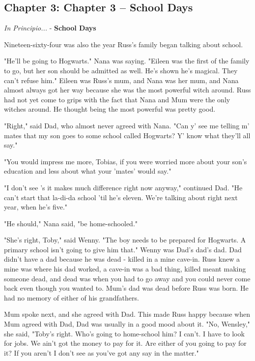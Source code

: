 \documentclass[a4paper,11pt]{article}
\begin{document}
\subsection{Chapter 3: Chapter 3 – School Days}

\emph{In Principio...} - \textbf{School Days}

Nineteen-sixty-four was also the year Russ's family began talking about school.

"He'll be going to Hogwarts." Nana was saying. "Eileen was the first of the family to go, but her son should be admitted as well. He's shown he's magical. They can't refuse him." Eileen was Russ's mum, and Nana was her mum, and Nana almost always got her way because she was the most powerful witch around. Russ had not yet come to grips with the fact that Nana and Mum were the only witches around. He thought being the most powerful was pretty good.

"Right," said Dad, who almost never agreed with Nana. "Can y' see me telling m' mates that my son goes to some school called Hogwarts? Y' know what they'll all say."

"You would impress me more, Tobias, if you were worried more about your son's education and less about what your 'mates' would say."

"I don't see 's it makes much difference right now anyway," continued Dad. "He can't start that la-di-da school 'til he's eleven. We're talking about right next year, when he's five."

"He should," Nana said, "be home-schooled."

"She's right, Toby," said Wenny. "The boy needs to be prepared for Hogwarts. A primary school isn't going to give him that." Wenny was Dad's dad's dad. Dad didn't have a dad because he was dead - killed in a mine cave-in. Russ knew a mine was where his dad worked, a cave-in was a bad thing, killed meant making someone dead, and dead was when you had to go away and you could never come back even though you wanted to. Mum's dad was dead before Russ was born. He had no memory of either of his grandfathers.

Mum spoke next, and she agreed with Dad. This made Russ happy because when Mum agreed with Dad, Dad was usually in a good mood about it. "No, Wensley," she said, "Toby's right. Who's going to home-school him? I can't. I have to look for jobs. We ain't got the money to pay for it. Are either of you going to pay for it? If you aren't I don't see as you've got any say in the matter."
\end{document}
